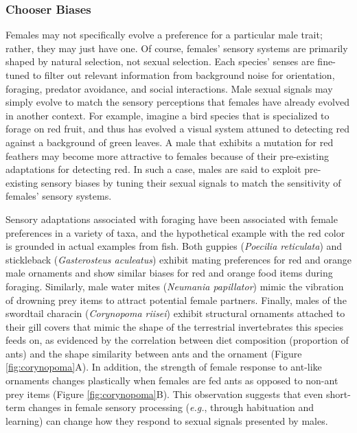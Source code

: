 \documentclass[
]{book}
\begin{document}
\hypertarget{chooser-biases}{%
\subsubsection*{Chooser Biases}\label{chooser-biases}}

Females may not specifically evolve a preference for a particular male trait; rather, they may just have one. Of course, females' sensory systems are primarily shaped by natural selection, not sexual selection. Each species' senses are fine-tuned to filter out relevant information from background noise for orientation, foraging, predator avoidance, and social interactions. Male sexual signals may simply evolve to match the sensory perceptions that females have already evolved in another context. For example, imagine a bird species that is specialized to forage on red fruit, and thus has evolved a visual system attuned to detecting red against a background of green leaves. A male that exhibits a mutation for red feathers may become more attractive to females because of their pre-existing adaptations for detecting red. In such a case, males are said to exploit pre-existing sensory biases by tuning their sexual signals to match the sensitivity of females' sensory systems.

Sensory adaptations associated with foraging have been associated with female preferences in a variety of taxa, and the hypothetical example with the red color is grounded in actual examples from fish. Both guppies (\emph{Poecilia reticulata}) and stickleback (\emph{Gasterosteus aculeatus}) exhibit mating preferences for red and orange male ornaments and show similar biases for red and orange food items during foraging. Similarly, male water mites (\emph{Neumania papillator}) mimic the vibration of drowning prey items to attract potential female partners. Finally, males of the swordtail characin (\emph{Corynopoma riisei}) exhibit structural ornaments attached to their gill covers that mimic the shape of the terrestrial invertebrates this species feeds on, as evidenced by the correlation between diet composition (proportion of ants) and the shape similarity between ants and the ornament (Figure \ref{fig:corynopoma}A). In addition, the strength of female response to ant-like ornaments changes plastically when females are fed ants as opposed to non-ant prey items (Figure \ref{fig:corynopoma}B). This observation suggests that even short-term changes in female sensory processing (\emph{e.g.}, through habituation and learning) can change how they respond to sexual signals presented by males.
\end{document}
